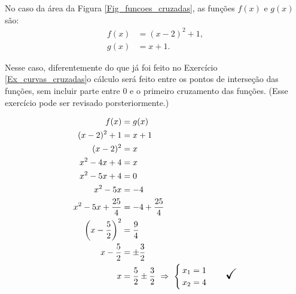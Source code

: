 \begin{exercicio}
  
No caso da área da Figura \ref{Fig_funcoes_cruzadas}, as funções \(f(x)\) e \(g(x)\) são:
\begin{align*}
f(x)&=(x-2)^2+1,\\
g(x)&=x+1.
\end{align*}

Nesse caso, diferentemente do que já foi feito no Exercício \ref{Ex_curvas_cruzadas}o cálculo será feito entre os pontos de interseção das funções, sem incluir parte entre 0 e o primeiro cruzamento das funções. (Esse exercício pode ser revisado porsteriormente.)

\begin{align*}
      f(x)&=g(x)\\
      (x-2)^2+1&=x+1\\
      (x-2)^2&=x\\
      x^2-4x+4&=x\\
      x^2-5x+4&=0\\
      x^2-5x&=-4\\
      x^2-5x+\frac{25}{4}&=-4+\frac{25}{4}\\
      \left(x-\frac{5}{2}\right)^2&=\frac{9}{4}\\
      x-\frac{5}{2}&=\pm\frac{3}{2}\\
      x&=\frac{5}{2}\pm\frac{3}{2}
    \ \Rightarrow\
      \begin{cases}
      x_1=1\\
      x_2=4
      \end{cases}
\quad \text{\LARGE$\checkmark$}
\end{align*}

\begin{figure}[H]
  \centering
\end{figure}
\end{exercicio}
